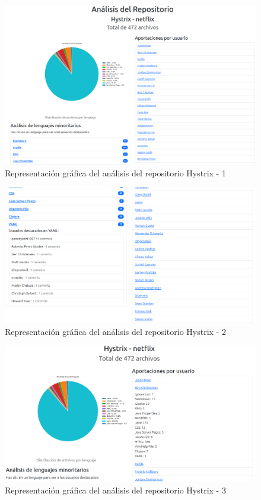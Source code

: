 \documentclass[a4paper, 12pt]{book}
\begin{document}
\begin{figure}[H]
  \centering
  \includegraphics[width=1\textwidth]{img/analisishystrix.png}
  \caption{Representación gráfica del análisis del repositorio Hystrix - 1}
  \label{figura:analisishystrix1}
\end{figure}

\begin{figure}[H]
  \centering
  \includegraphics[width=1\textwidth]{img/analisishystrix2.png}
  \caption{Representación gráfica del análisis del repositorio Hystrix - 2}
  \label{figura:analisishystrix2}
\end{figure}

\begin{figure}[H]
  \centering
  \includegraphics[width=1\textwidth]{img/analisishystrix3.png}
  \caption{Representación gráfica del análisis del repositorio Hystrix - 3}
  \label{figura:analisishystrix3}
\end{figure}
\end{document}
